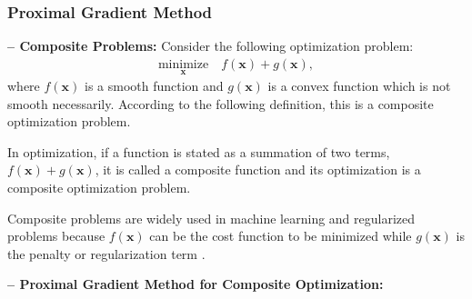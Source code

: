 \documentclass[lang=cn,10pt]{gorgeousnbook}
\numberwithin{equation}{section}%
\numberwithin{figure}{section}%
\begin{document}
\subsubsection{Proximal Gradient Method}




\textbf{-- Composite Problems:}
Consider the following optimization problem:
\begin{align}\label{equation_composite_optimization}
\underset{\boldsymbol{x}}{\text{minimize}}\quad f(\boldsymbol{x}) + g(\boldsymbol{x}),
\end{align}
where $f(\boldsymbol{x})$ is a smooth function and $g(\boldsymbol{x})$ is a convex function which is not smooth necessarily. According to the following definition, this is a composite optimization problem. 

\begin{definition}
In optimization, if a function is stated as a summation of two terms, $f(\boldsymbol{x}) + g(\boldsymbol{x})$, it is called a composite function and its optimization is a composite optimization problem. 
\end{definition}

Composite problems are widely used in machine learning and regularized problems because $f(\boldsymbol{x})$ can be the cost function to be minimized while $g(\boldsymbol{x})$ is the penalty or regularization term \cite{ghojogh2019theory}. 

\hfill\break
\textbf{-- Proximal Gradient Method for Composite Optimization:}
\end{document}
